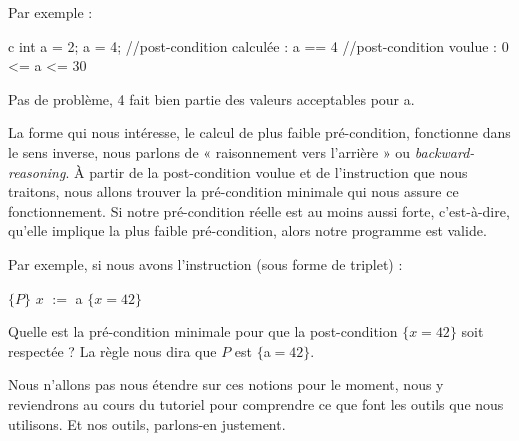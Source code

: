 Par exemple :

\begin{CodeBlock}{c}
int a = 2;
a = 4;
//post-condition calculée : a == 4
//post-condition voulue   : 0 <= a <= 30
\end{CodeBlock}



Pas de problème, 4 fait bien partie des valeurs acceptables pour a.



La forme qui nous intéresse, le calcul de plus faible pré-condition, fonctionne
dans le sens inverse, nous parlons de « raisonnement vers l'arrière » ou 
\textit{backward-reasoning}. À partir de la post-condition voulue et de 
l'instruction que nous traitons, nous allons trouver la pré-condition minimale
qui nous assure ce fonctionnement. Si notre pré-condition réelle est au moins
aussi forte, c'est-à-dire, qu'elle implique la plus faible pré-condition, alors
notre programme est valide.



Par exemple, si nous avons l'instruction (sous forme de triplet) :



$\{P\}$ $x$ $:=$ a $\{x = 42\}$



Quelle est la pré-condition minimale pour que la post-condition $\{x = 42\}$ 
soit respectée ? La règle nous dira que $P$ est $\{$a$=42\}$.



Nous n'allons pas nous étendre sur ces notions pour le moment, nous y 
reviendrons au cours du tutoriel pour comprendre ce que font les outils que
nous utilisons. Et nos outils, parlons-en justement.

